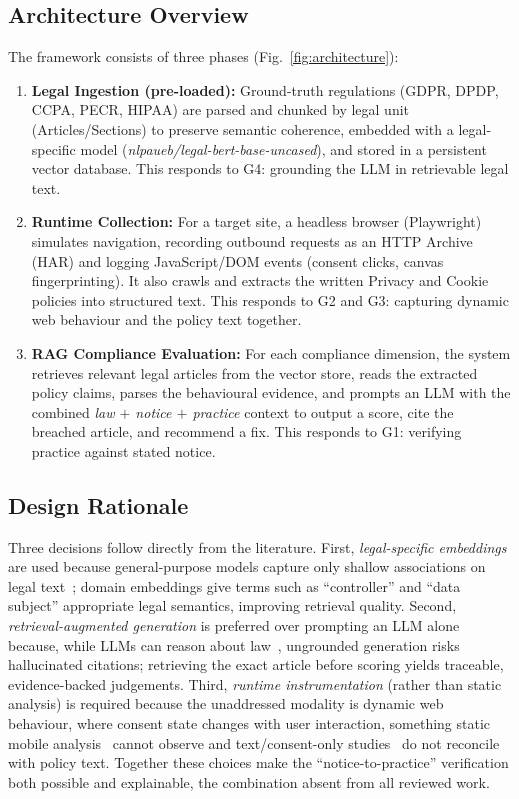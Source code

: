 \documentclass[conference]{IEEEtran}
\begin{document}
\subsection{Architecture Overview}
The framework consists of three phases (Fig.~\ref{fig:architecture}):
\begin{enumerate}
    \item \textbf{Legal Ingestion (pre-loaded):} Ground-truth regulations (GDPR, DPDP, CCPA, PECR, HIPAA) are parsed and chunked by legal unit (Articles/Sections) to preserve semantic coherence, embedded with a legal-specific model (\textsl{nlpaueb/legal-bert-base-uncased}), and stored in a persistent vector database. This responds to G4: grounding the LLM in retrievable legal text.
    \item \textbf{Runtime Collection:} For a target site, a headless browser (Playwright) simulates navigation, recording outbound requests as an HTTP Archive (HAR) and logging JavaScript/DOM events (consent clicks, canvas fingerprinting). It also crawls and extracts the written Privacy and Cookie policies into structured text. This responds to G2 and G3: capturing dynamic web behaviour and the policy text together.
    \item \textbf{RAG Compliance Evaluation:} For each compliance dimension, the system retrieves relevant legal articles from the vector store, reads the extracted policy claims, parses the behavioural evidence, and prompts an LLM with the combined \emph{law $+$ notice $+$ practice} context to output a score, cite the breached article, and recommend a fix. This responds to G1: verifying practice against stated notice.
\end{enumerate}

\subsection{Design Rationale}
Three decisions follow directly from the literature. First, \textit{legal-specific embeddings} are used because general-purpose models capture only shallow associations on legal text~\cite{wilson-2016-opp115,harkous-2018-polisis}; domain embeddings give terms such as ``controller'' and ``data subject'' appropriate legal semantics, improving retrieval quality. Second, \textit{retrieval-augmented generation} is preferred over prompting an LLM alone because, while LLMs can reason about law~\cite{guha-2023-legalbench,xie-2025-llmpolicy}, ungrounded generation risks hallucinated citations; retrieving the exact article before scoring yields traceable, evidence-backed judgements. Third, \textit{runtime instrumentation} (rather than static analysis) is required because the unaddressed modality is dynamic web behaviour, where consent state changes with user interaction, something static mobile analysis~\cite{zimmeck-2017-mobileapps,zimmeck-2019-maps} cannot observe and text/consent-only studies~\cite{trevisan-2019-cookielaw,bouhoula-2024-cookies} do not reconcile with policy text. Together these choices make the ``notice-to-practice'' verification both possible and explainable, the combination absent from all reviewed work.
\end{document}
